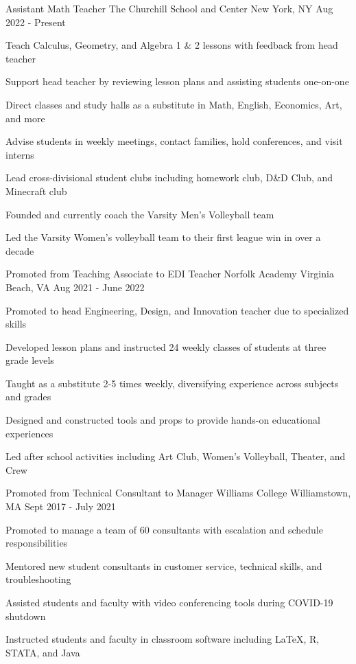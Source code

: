 \begin{cventries}
  \cventry
  {Assistant Math Teacher}
  {The Churchill School and Center}
  {New York, NY}
  {Aug 2022 - Present}
  {
    \begin{cvitems}
      \item {Teach Calculus, Geometry, and Algebra 1 \& 2 lessons with feedback from head teacher}
      \item {Support head teacher by reviewing lesson plans and assisting students one-on-one}
      \item {Direct classes and study halls as a substitute in Math, English, Economics, Art, and more}
      \item {Advise students in weekly meetings, contact families, hold conferences, and visit interns}
      \item {Lead cross-divisional student clubs including homework club, D\&D Club, and Minecraft club}
      \item {Founded and currently coach the Varsity Men's Volleyball team}
      \item {Led the Varsity Women's volleyball team to their first league win in over a decade}
    \end{cvitems}
  }

  \cventry
  {Promoted from Teaching Associate to EDI Teacher}
  {Norfolk Academy}
  {Virginia Beach, VA}
  {Aug 2021 - June 2022}
  {
    \begin{cvitems}
      \item {Promoted to head Engineering, Design, and Innovation teacher due to specialized skills}
      \item {Developed lesson plans and instructed 24 weekly classes of students at three grade levels}
      \item {Taught as a substitute 2-5 times weekly, diversifying experience across subjects and grades}
      \item {Designed and constructed tools and props to provide hands-on educational experiences}
      \item {Led after school activities including Art Club, Women's Volleyball, Theater, and Crew}
    \end{cvitems}
  }

  \cventry
  {Promoted from Technical Consultant to Manager}
  {Williams College}
  {Williamstown, MA}
  {Sept 2017 - July 2021}
  {
    \begin{cvitems}
      \item {Promoted to manage a team of 60 consultants with escalation and schedule responsibilities}
      \item {Mentored new student consultants in customer service, technical skills, and troubleshooting}
      \item {Assisted students and faculty with video conferencing tools during COVID-19 shutdown}
      \item {Instructed students and faculty in classroom software including LaTeX, R, STATA, and Java}
    \end{cvitems}
  }


\end{cventries}
